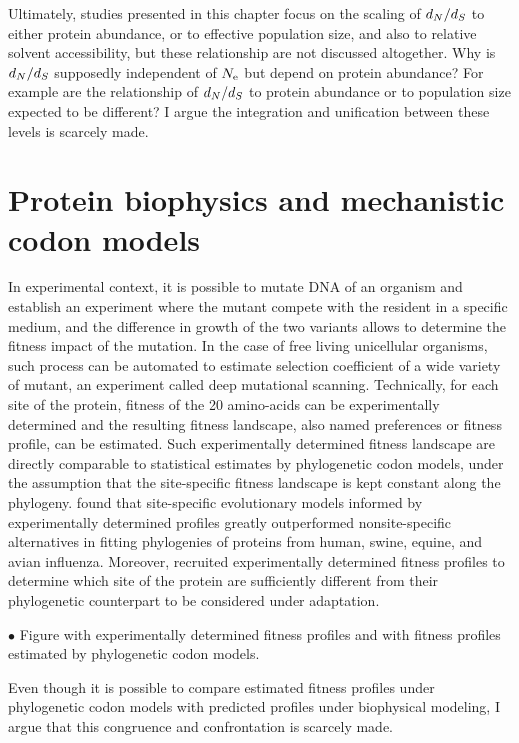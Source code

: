 Ultimately, studies presented in this chapter focus on the scaling of $d_N / d_S$ to either protein abundance, or to effective population size, and also to relative solvent accessibility, but these relationship are not discussed altogether.
Why is $d_N / d_S$ supposedly independent of $N_{\textrm{e}}$ but depend on protein abundance?
For example are the relationship of $d_N / d_S$ to protein abundance or to population size expected to be different?
I argue the integration and unification between these levels is scarcely made.

\section{Protein biophysics and mechanistic codon models}

In experimental context, it is possible to mutate DNA of an organism and establish an experiment where the mutant compete with the resident in a specific medium, and the difference in growth of the two variants allows to determine the fitness impact of the mutation.
In the case of free living unicellular organisms, such process can be automated to estimate selection coefficient of a wide variety of mutant, an experiment called deep mutational scanning.
Technically, for each site of the protein, fitness of the 20 amino-acids can be experimentally determined and the resulting fitness landscape, also named preferences or fitness profile, can be estimated.
Such experimentally determined fitness landscape are directly comparable to statistical estimates by phylogenetic codon models, under the assumption that the site-specific fitness landscape is kept constant along the phylogeny.
\citet{Doud2015} found that site-specific evolutionary models informed by experimentally determined profiles greatly outperformed nonsite-specific alternatives in fitting phylogenies of proteins from human, swine, equine, and avian influenza. 
Moreover, \citet{Bloom2017} recruited experimentally determined fitness profiles to determine which site of the protein are sufficiently different from their phylogenetic counterpart to be considered under adaptation.

$\bullet$ Figure with experimentally determined fitness profiles and with fitness profiles estimated by phylogenetic codon models.

Even though it is possible to compare estimated fitness profiles under phylogenetic codon models with predicted profiles under biophysical modeling, I argue that this congruence and confrontation is scarcely made.

